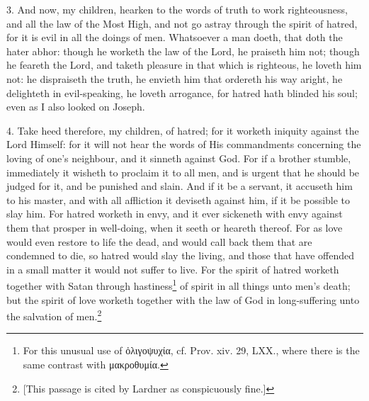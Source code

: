 3. And now, my children, hearken to the words of truth to work righteousness, and all the law of the Most High, and not go astray through the spirit of hatred, for it is evil in all the doings of men. Whatsoever a man doeth, that doth the hater abhor: though he worketh the law of the Lord, he praiseth him not; though he feareth the Lord, and taketh pleasure in that which is righteous, he loveth him not: he dispraiseth the truth, he envieth him that ordereth his way aright, he delighteth in evil-speaking, he loveth arrogance, for hatred hath blinded his soul; even as I also looked on Joseph.

4. Take heed therefore, my children, of hatred; for it worketh iniquity against the Lord Himself: for it will not hear the words of His commandments concerning the loving of one’s neighbour, and it sinneth against God. For if a brother stumble, immediately it wisheth to proclaim it to all men, and is urgent that he should be judged for it, and be punished and slain. And if it be a servant, it accuseth him to his master, and with all affliction it deviseth against him, if it be possible to slay him. For hatred worketh in envy, and it ever sickeneth with envy against them that prosper in well-doing, when it seeth or heareth thereof. For as love would even restore to life the dead, and would call back them that are condemned to die, so hatred would slay the living, and those that have offended in a small matter it would not suffer to live. For the spirit of hatred worketh together with Satan through hastiness\footnote{For this unusual use of \textgreek{ὀλιγοψυχία}, cf. Prov. xiv. 29, LXX., where there is the same contrast with \textgreek{μακροθυμία}.} of spirit in all things unto men’s death; but the spirit of love worketh together with the law of God in long-suffering unto the salvation of men.\footnote{[This passage is cited by Lardner as conspicuously fine.]}

